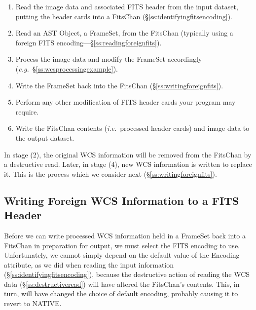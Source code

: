 \documentclass[twoside,11pt]{article}
\newcommand{\secref}[1]{\S\ref{#1}}
\newcommand{\secref}[1]{\ref{#1}}
\begin{document}
\begin{enumerate}
\item Read the image data and associated FITS header from the input
dataset, putting the header cards into a FitsChan
(\secref{ss:identifyingfitsencoding}).

\item Read an AST Object, a FrameSet, from the FitsChan (typically
using a foreign FITS encoding---\secref{ss:readingforeignfits}).

\item Process the image data and modify the FrameSet accordingly
({\em{e.g.}}~\secref{ss:wcsprocessingexample}).

\item Write the FrameSet back into the FitsChan
(\secref{ss:writingforeignfits}).

\item Perform any other modification of FITS header cards your program
may require.

\item Write the FitsChan contents ({\em{i.e.}}\ processed header
cards) and image data to the output dataset.
\end{enumerate}

In stage (2), the original WCS information will be removed from the
FitsChan by a destructive read. Later, in stage (4), new WCS
information is written to replace it. This is the process which we
consider next (\secref{ss:writingforeignfits}).

\subsection{\label{ss:writingforeignfits}Writing Foreign WCS Information to a FITS Header}

Before we can write processed WCS information held in a FrameSet back
into a FitsChan in preparation for output, we must select the FITS
encoding to use.  Unfortunately, we cannot simply depend on the
default value of the Encoding attribute, as we did when reading the
input information (\secref{ss:identifyingfitsencoding}), because the
destructive action of reading the WCS data
(\secref{ss:destructiveread}) will have altered the FitsChan's
contents. This, in turn, will have changed the choice of default
encoding, probably causing it to revert to NATIVE.
\end{document}
